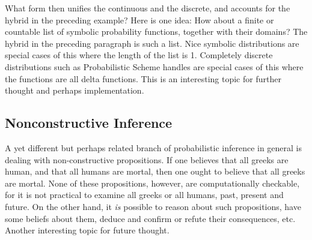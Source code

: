 \documentclass[12pt]{article}
\begin{document}
What form then unifies the continuous and the discrete, and accounts
for the hybrid in the preceding example?  Here is one idea: How about
a finite or countable list of symbolic probability functions, together
with their domains?  The hybrid in the preceding paragraph is such a
list.  Nice symbolic distributions are special cases of this where the
length of the list is 1.  Completely discrete distributions such as
Probabilistic Scheme handles are special cases of this where the
functions are all delta functions.  This is an interesting topic for
further thought and perhaps implementation.

\subsection{Nonconstructive Inference}
\label{nonconstructive}

A yet different but perhaps related branch of probabilistic inference
in general is dealing with non-constructive propositions.  If one
believes that all greeks are human, and that all humans are mortal,
then one ought to believe that all greeks are mortal.  None of these
propositions, however, are computationally checkable, for it is not
practical to examine all greeks or all humans, past, present and future.
On the other hand, it \emph{is} possible to reason about such
propositions, have some beliefs about them, deduce and confirm or
refute their consequences, etc.  Another interesting topic for future
thought.



\end{document}
